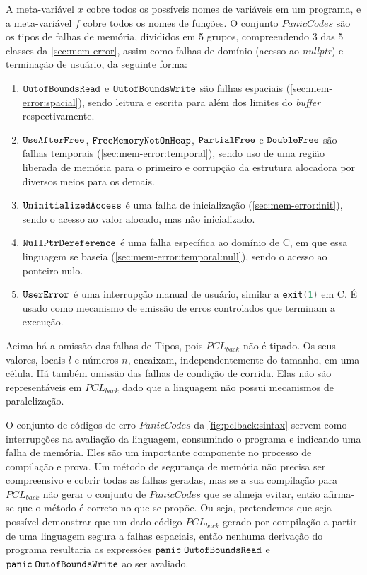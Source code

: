 A meta-variável $x$ cobre todos os possíveis nomes de variáveis em um programa, e a meta-variável $f$ cobre todos os nomes de funções. O conjunto $PanicCodes$ são os tipos de falhas de memória, divididos em 5 grupos, compreendendo 3 das 5 classes da \autoref{sec:mem-error}, assim como falhas de domínio (acesso ao \emph{nullptr}) e terminação de usuário, da seguinte forma:
\begin{enumerate}
	\item $\texttt{OutofBoundsRead}$ e $\texttt{OutofBoundsWrite}$ são falhas espaciais (\autoref{sec:mem-error:spacial}), sendo leitura e escrita para além dos limites do \emph{buffer} respectivamente.
	\item $\texttt{UseAfterFree}$, $\texttt{FreeMemoryNotOnHeap}$, $\texttt{PartialFree}$ e $\texttt{DoubleFree}$ são falhas temporais (\autoref{sec:mem-error:temporal}), sendo uso de uma região liberada de memória para o primeiro e corrupção da estrutura alocadora por diversos meios para os demais.
	\item $\texttt{UninitializedAccess}$ é uma falha de inicialização (\autoref{sec:mem-error:init}), sendo o acesso ao valor alocado, mas não inicializado. 
	\item $\texttt{NullPtrDereference}$ é uma falha específica ao domínio de C, em que essa linguagem se baseia (\autoref{sec:mem-error:temporal:null}), sendo o acesso ao ponteiro nulo.
	\item $\texttt{UserError}$ é uma interrupção manual de usuário, similar a \lstinline[language=C]|exit(1)| em C. É usado como mecanismo de emissão de erros controlados que terminam a execução.
\end{enumerate}

\noindent Acima há a omissão das falhas de Tipos, pois $PCL_{back}$ não é tipado. Os seus valores, locais $l$ e números $n$, encaixam, independentemente do tamanho, em uma célula. Há também omissão das falhas de condição de corrida. Elas não são representáveis em $PCL_{back}$ dado que a linguagem não possui mecanismos de paralelização.

O conjunto de códigos de erro $PanicCodes$ da \autoref{fig:pclback:sintax} servem como interrupções na avaliação da linguagem, consumindo o programa e indicando uma falha de memória. Eles são um importante componente no processo de compilação e prova. Um método de segurança de memória não precisa ser compreensivo e cobrir todas as falhas geradas, mas se a sua compilação para $PCL_{back}$ não gerar o conjunto de $PanicCodes$ que se almeja evitar, então afirma-se que o método é correto no que se propõe. Ou seja, pretendemos que seja possível demonstrar que um dado código $PCL_{back}$ gerado por compilação a partir de uma linguagem segura a falhas espaciais, então nenhuma derivação do programa resultaria as expressões $\texttt{panic}\;\texttt{OutofBoundsRead}$ e $\texttt{panic}\;\texttt{OutofBoundsWrite}$ ao ser avaliado.

